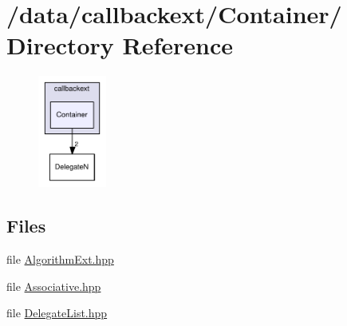 \hypertarget{dir_000002}{
\section{/data/callbackext/Container/ Directory Reference}
\label{dir_000002}
}


\begin{figure}[H]
\begin{center}
\leavevmode
\includegraphics[width=64pt]{dir_000002_dep}
\end{center}
\end{figure}
\subsection*{Files}
\begin{CompactItemize}
\item 
file \hyperlink{AlgorithmExt_8hpp}{Algorithm\-Ext.hpp}
\item 
file \hyperlink{Associative_8hpp}{Associative.hpp}
\item 
file \hyperlink{DelegateList_8hpp}{Delegate\-List.hpp}
\end{CompactItemize}
